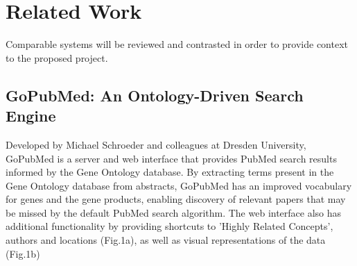 \documentclass[PROP_AGutteridge_CS.tex]{subfiles}
\begin{document}
\chapter{Related Work}
Comparable systems will be reviewed and contrasted in order to provide context to the proposed project.

\section{GoPubMed: An Ontology-Driven Search Engine}
Developed by Michael Schroeder and colleagues at Dresden University, GoPubMed is a server and web interface that provides PubMed search results informed by the Gene Ontology database\cite{doms}. By extracting terms present in the Gene Ontology database from abstracts, GoPubMed has an improved vocabulary for genes and the gene products, enabling discovery of relevant papers that may be missed by the default PubMed search algorithm. The web interface also has additional functionality by providing shortcuts to 'Highly Related Concepts', authors and locations (Fig.1a), as well as visual representations of the data (Fig.1b) \\
\end{document}
